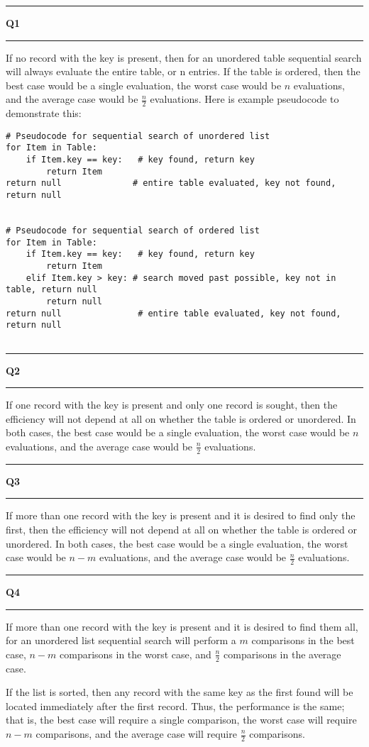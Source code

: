\documentclass[11pt]{article}
\newcommand\question[2]{\vspace{.25in}\hrule\textbf{#1 #2}\vspace{.5em}\hrule\vspace{.10in}}
\begin{document}
\raggedright
\newcommand\NAME{Sean Connor}  %
\newcommand\HWNUM{10}              %

\question{Q1}{}
If no record with the key is present, then for an unordered table sequential search will always evaluate the entire table, or n entries. If the table is ordered, then the best case would be a single evaluation, the worst case would be $n$ evaluations, and the average case would be $\frac{n}{2}$ evaluations. Here is example pseudocode to demonstrate this:

\begin{lstlisting}
# Pseudocode for sequential search of unordered list
for Item in Table:
	if Item.key == key:   # key found, return key
		return Item
return null              # entire table evaluated, key not found, return null


# Pseudocode for sequential search of ordered list
for Item in Table:
	if Item.key == key:   # key found, return key
		return Item
	elif Item.key > key: # search moved past possible, key not in table, return null
		return null
return null               # entire table evaluated, key not found, return null
	
\end{lstlisting}

\question{Q2}{}
If one record with the key is present and only one record is sought, then the efficiency will not depend at all on whether the table is ordered or unordered. In both cases, the best case would be a single evaluation, the worst case would be $n$ evaluations, and the average case would be $\frac{n}{2}$ evaluations. 

\question{Q3}{}
If more than one record with the key is present and it is desired to find only the first, then the efficiency will not depend at all on whether the table is ordered or unordered. In both cases, the best case would be a single evaluation, the worst case would be $n-m$ evaluations, and the average case would be $\frac{n}{2}$ evaluations. 

\question{Q4}{}
If more than one record with the key is present and it is desired to find them all, for an unordered list sequential search will perform a $m$ comparisons in the best case, $n-m$ comparisons in the worst case, and $\frac{n}{2}$ comparisons in the average case. 

If the list is sorted, then any record with the same key as the first found will be located immediately after the first record. Thus, the performance is the same; that is, the best case will require a single comparison, the worst case will require $n-m$ comparisons, and the average case will require $\frac{n}{2}$ comparisons.
\end{document}
